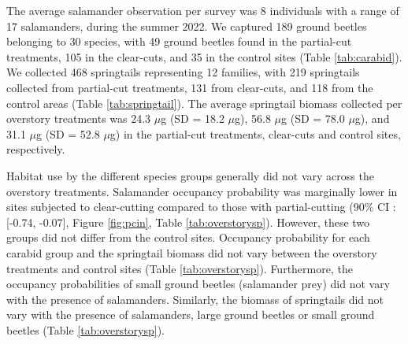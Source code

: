 \vspace{10pt}

The average salamander observation per survey was 8 individuals with a range of 17 salamanders, during the summer 2022.
We captured 189 ground beetles belonging to 30 species, with 49 ground beetles found in the partial-cut treatments, 105 in the clear-cuts, and 35 in the control sites (Table \ref{tab:carabid}). 
We collected 468 springtails representing 12 families, with 219 springtails collected from partial-cut treatments, 131 from clear-cuts, and 118 from the control areas (Table \ref{tab:springtail}). 
The average springtail biomass collected per overstory treatments was 24.3 $\mu$g (SD = 18.2 $\mu$g), 56.8 $\mu$g (SD = 78.0 $\mu$g), and 31.1 $\mu$g (SD = 52.8 $\mu$g) in the partial-cut treatments, clear-cuts and control sites, respectively.

Habitat use by the different species groups generally did not vary across the overstory treatments. 
Salamander occupancy probability was marginally lower in sites subjected to clear-cutting compared to those with partial-cutting (90\% CI : [-0.74, -0.07], Figure \ref{fig:pcin}, Table \ref{tab:overstorysp}). 
However, these two groups did not differ from the control sites. 
Occupancy probability for each carabid group and the springtail biomass did not vary between the overstory treatments and control sites (Table \ref{tab:overstorysp}). 
Furthermore, the occupancy probabilities of small ground beetles (salamander prey) did not vary with the presence of salamanders. 
Similarly, the biomass of springtails did not vary with the presence of salamanders, large ground beetles or small ground beetles (Table \ref{tab:overstorysp}).

\vspace{10pt}


